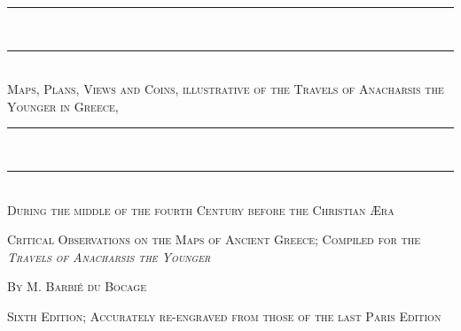 \documentclass[a4paper, 11pt, oneside, polutonikogreek, english]{article}
\begin{document}
\begin{titlepage}
    \centering                     %

    \rule{\textwidth}{1.6pt}\\[-\baselineskip]\vskip2pt
    \rule{\textwidth}{0.4pt}\\[1\baselineskip]

    {\scshape\Huge Maps, Plans, Views and Coins, illustrative of the Travels of Anacharsis the Younger in Greece,}\\[1\baselineskip]

    \rule{\textwidth}{0.4pt}\\[-\baselineskip]\vskip3.2pt
    \rule{\textwidth}{1.6pt}\\[1\baselineskip]

    
    {\scshape\large During the middle of the fourth Century before the Christian Æra \\\Large }


    \vspace{0.5\baselineskip}
    
    {\scshape \small Critical Observations on the Maps of Ancient Greece; Compiled for the \emph{Travels of Anacharsis the Younger}}

    {\scshape By \Large M. Barbié du Bocage}


    \vfill

    {\scshape\small Sixth Edition; Accurately re-engraved from those of the last Paris Edition}

    \vspace{0.5\baselineskip}


\end{titlepage}
\end{document}
